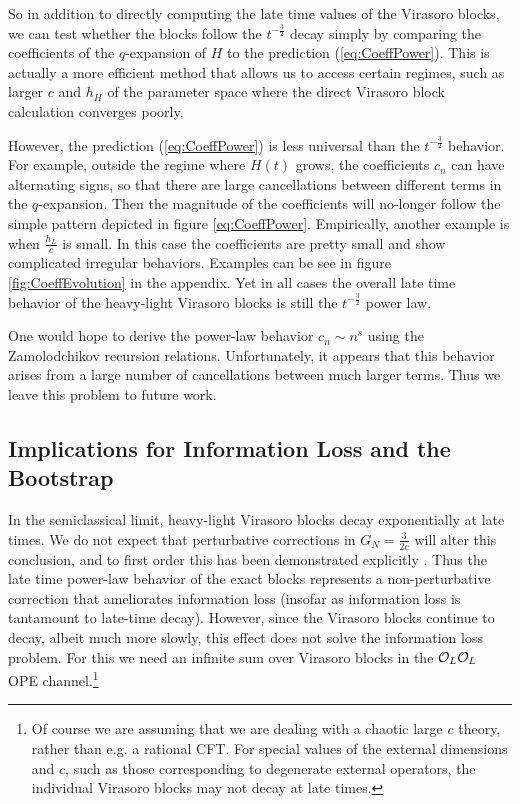 So in addition to directly computing the late time values of the Virasoro blocks, we can test whether the blocks follow the $t^{-\frac{3}{2}}$ decay simply by comparing the coefficients of the $q$-expansion of $H$ to the prediction (\ref{eq:CoeffPower}). This is actually a more efficient method that allows us to access certain regimes, such as larger $c$ and $h_H$ of the parameter space where the direct Virasoro block calculation converges poorly. 

 However, the prediction (\ref{eq:CoeffPower}) is less universal than the $t^{-\frac{3}{2}}$  behavior.  For example, outside the regime where $H(t)$ grows, the coefficients $c_n$ can have alternating signs, so that there are  large cancellations between different terms in the $q$-expansion.  Then the magnitude of the coefficients will no-longer follow the simple pattern depicted in figure \ref{eq:CoeffPower}.  Empirically, another example is when $\frac{h_L}{c}$ is small. In this case the coefficients are pretty small and show complicated irregular behaviors. Examples can be see in figure \ref{fig:CoeffEvolution} in the appendix. Yet in all cases the overall late time behavior of the heavy-light Virasoro blocks is still the $t^{-\frac{3}{2}}$ power law.  

One would hope to derive the power-law behavior $c_n \sim n^s$ using the Zamolodchikov recursion relations.  Unfortunately, it appears that this behavior arises from a large number of cancellations between much larger terms.  Thus we leave this problem to future work. 



\subsection{Implications for Information Loss and the Bootstrap}

In the semiclassical limit, heavy-light Virasoro blocks decay exponentially at late times.  We do not expect that perturbative corrections in $G_N = \frac{3}{2c}$ will alter this conclusion, and to first order this has been demonstrated explicitly \cite{Fitzpatrick:2015dlt}.  Thus the late time power-law behavior of the exact blocks represents a non-perturbative correction that ameliorates information loss (insofar as information loss is tantamount to late-time decay).  However, since the Virasoro blocks continue to decay, albeit much more slowly, this effect does not solve the information loss problem.  For this we need an infinite sum over Virasoro blocks in the ${\cal O}_L {\cal O}_L$ OPE channel.\footnote{Of course we are assuming that we are dealing with a chaotic large $c$ theory, rather than e.g. a rational CFT.  For special values of the external dimensions and $c$, such as those corresponding to degenerate external operators, the individual Virasoro blocks may not decay at late times.}  

